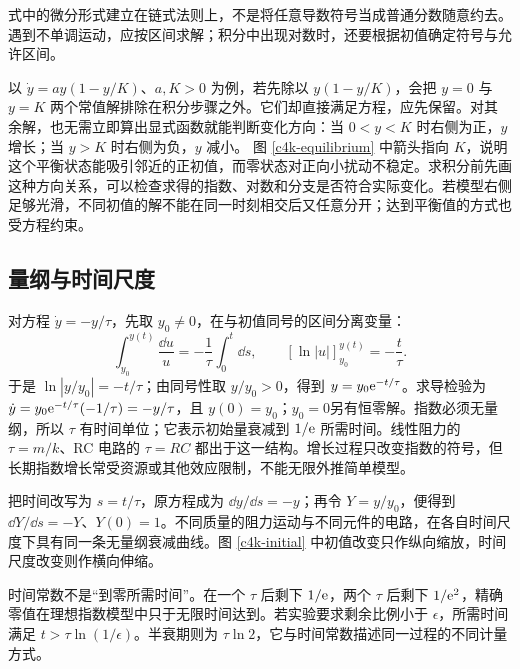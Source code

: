式中的微分形式建立在链式法则上，不是将任意导数符号当成普通分数随意约去。遇到不单调运动，应按区间求解；积分中出现对数时，还要根据初值确定符号与允许区间。

以 $\dot y=a y(1-y/K)$、$a,K>0$ 为例，若先除以 $y(1-y/K)$，会把 $y=0$ 与 $y=K$ 两个常值解排除在积分步骤之外。它们却直接满足方程，应先保留。对其余解，也无需立即算出显式函数就能判断变化方向：当 $0<y<K$ 时右侧为正，$y$ 增长；当 $y>K$ 时右侧为负，$y$ 减小。
图 \ref{c4k-equilibrium} 中箭头指向 $K$，说明这个平衡状态能吸引邻近的正初值，而零状态对正向小扰动不稳定。求积分前先画这种方向关系，可以检查求得的指数、对数和分支是否符合实际变化。若模型右侧足够光滑，不同初值的解不能在同一时刻相交后又任意分开；达到平衡值的方式也受方程约束。

\subsection{量纲与时间尺度}
对方程 $\dot y=-y/\tau$，先取 $y_0\ne0$，在与初值同号的区间分离变量：
\[
 \int_{y_0}^{y(t)}\frac{\dd u}{u}
 =-\frac1\tau\int_0^t\dd s,
 \qquad [\ln|u|]_{y_0}^{y(t)}=-\frac t\tau.
\]
于是 $\ln|y/y_0|=-t/\tau$；由同号性取 $y/y_0>0$，得到 $y=y_0\mathrm e^{-t/\tau}$。求导检验为 $\dot y=y_0\mathrm e^{-t/\tau}(-1/\tau)=-y/\tau$，且 $y(0)=y_0$；$y_0=0$另有恒零解。指数必须无量纲，所以 $\tau$ 有时间单位；它表示初始量衰减到 $1/\mathrm e$ 所需时间。线性阻力的 $\tau=m/k$、RC 电路的 $\tau=RC$ 都出于这一结构。增长过程只改变指数的符号，但长期指数增长常受资源或其他效应限制，不能无限外推简单模型。

把时间改写为 $s=t/\tau$，原方程成为 $\dd y/\dd s=-y$；再令 $Y=y/y_0$，便得到 $\dd Y/\dd s=-Y$、$Y(0)=1$。不同质量的阻力运动与不同元件的电路，在各自时间尺度下具有同一条无量纲衰减曲线。图 \ref{c4k-initial} 中初值改变只作纵向缩放，时间尺度改变则作横向伸缩。

时间常数不是“到零所需时间”。在一个 $\tau$ 后剩下 $1/\mathrm e$，两个 $\tau$ 后剩下 $1/\mathrm e^2$，精确零值在理想指数模型中只于无限时间达到。若实验要求剩余比例小于 $\epsilon$，所需时间满足 $t>\tau\ln(1/\epsilon)$。半衰期则为 $\tau\ln2$，它与时间常数描述同一过程的不同计量方式。

